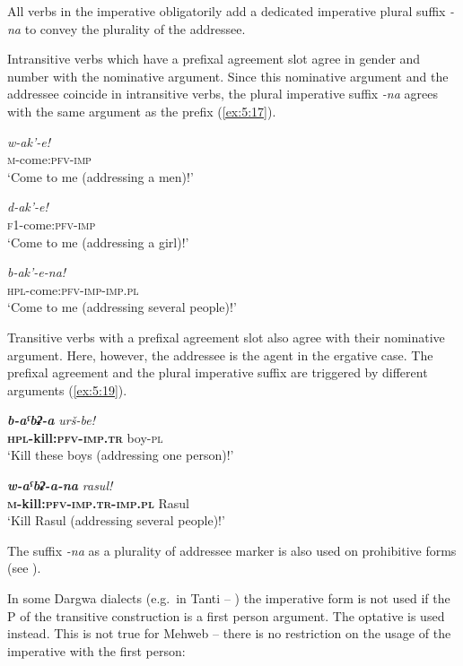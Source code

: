 ﻿\documentclass[output=paper]{langsci/langscibook}
\begin{document}
All verbs in the imperative obligatorily add a dedicated imperative
plural suffix \emph{-na} to convey the plurality
of the addressee.

Intransitive verbs which have a prefixal agreement slot agree in gender
and number with the nominative argument. Since this nominative
argument and the addressee coincide in intransitive verbs, the plural
imperative suffix \emph{-na} agrees with the same argument as the prefix
(\ref{ex:5:17}).

\ea %
\gll  \emph{w-ak'-e!}\\
 \textsc{m}-come:\textsc{pfv}-\textsc{imp}\\
\glt `Come to me (addressing a men)!'

\ex %
\gll  \emph{d-ak'-e!}\\
 \textsc{f1}-come:\textsc{pfv}-\textsc{imp}\\
\glt `Come to me (addressing a girl)!'

\ex \label{ex:5:17} %
\gll  \emph{b-ak'-e-na!}\\
 \textsc{hpl}-come:\textsc{pfv}-\textsc{imp}-\textsc{imp}.\textsc{pl}\\
\glt `Come to me (addressing several people)!'
\z

Transitive verbs with a prefixal agreement slot also agree with their
nominative argument. Here, however, the addressee is the agent in the
ergative case. The prefixal agreement and the plural imperative suffix
are triggered by different arguments (\ref{ex:5:19}).

\ea %
\gll  \emph{\textbf{b-aˤbʡ-a}}  \emph{urš-be!}\\
 \textbf{\textsc{hpl}-kill:\textsc{pfv}-\textsc{imp}.\textsc{tr}}  boy-\textsc{pl}\\
\glt `Kill these boys (addressing one person)!'

\ex \label{ex:5:19} %
\gll  \emph{\textbf{w-aˤbʡ-a-na}}  \emph{rasul!}\\
 \textbf{\textsc{m}-kill:\textsc{pfv}-\textsc{imp}.\textsc{tr}-\textsc{imp}.\textsc{pl}}  Rasul\\
\glt `Kill Rasul (addressing several people)!'
\z

The suffix \emph{-na} as a plurality of addressee marker is also used on
prohibitive forms (see ).

In some Dargwa dialects (e.g.\ in {Tanti} – \citealt[146]{sumbatova-lander2014})
the imperative form is not used if the P of the transitive construction
is a first person argument. The optative is used instead. This is not true for
Mehweb – there is no restriction on the usage of the imperative with
the first person:
\end{document}
